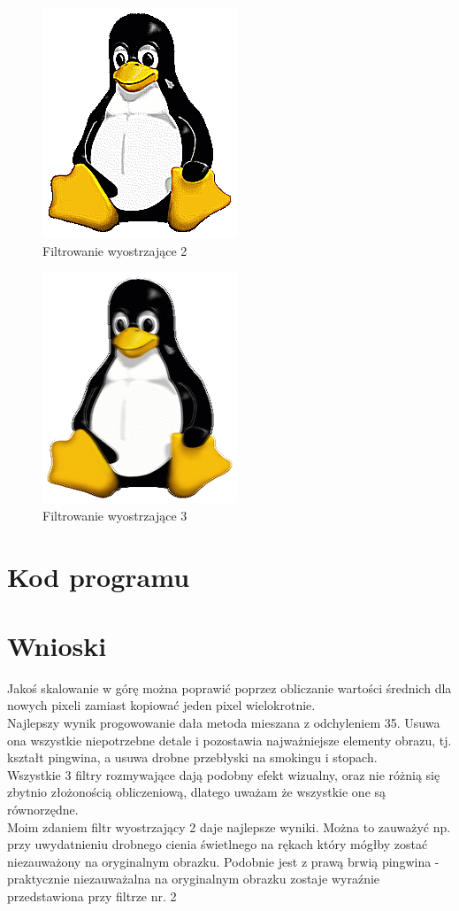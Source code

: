 \documentclass[12pt, a4paper]{article}
\begin{document}
\begin{figure}[p]
\includegraphics{splot_2_2}
\caption{Filtrowanie wyostrzające 2}
\label{fig:splot_2_2}
\end{figure}
\begin{figure}[p]
\includegraphics{splot_2_3}
\caption{Filtrowanie wyostrzające 3}
\label{fig:splot_2_3}
\end{figure}
\newpage
\section{Kod programu}

\section{Wnioski}
Jakoś skalowanie w górę można poprawić poprzez obliczanie wartości średnich dla nowych pixeli zamiast kopiować jeden pixel wielokrotnie.\\
Najlepszy wynik progowowanie dała metoda mieszana z odchyleniem 35. Usuwa ona wszystkie niepotrzebne detale i pozostawia najważniejsze elementy obrazu, tj. kształt pingwina, a usuwa drobne przebłyski na smokingu i stopach.\\
Wszystkie 3 filtry rozmywające dają podobny efekt wizualny, oraz nie różnią się zbytnio złożonością obliczeniową, dlatego uważam że wszystkie one są równorzędne.\\
Moim zdaniem filtr wyostrzający 2 daje najlepsze wyniki. Można to zauważyć np. przy uwydatnieniu drobnego cienia świetlnego na rękach który mógłby zostać niezauważony na oryginalnym obrazku. Podobnie jest z prawą brwią pingwina - praktycznie niezauważalna na oryginalnym obrazku zostaje wyraźnie przedstawiona przy filtrze nr. 2
\end{document}
